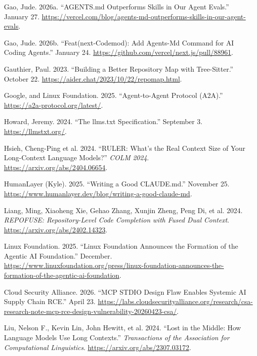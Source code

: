 \documentclass[
  11pt,
  letterpaper,
  numbers=noendperiod,
  parskip=half]{scrartcl}
\newlength{\cslhangindent}
\newenvironment{CSLReferences}[2] %
 {\begin{list}{}{%
  \setlength{\itemindent}{0pt}
  \setlength{\leftmargin}{0pt}
  \setlength{\parsep}{0pt}
  \ifodd #1
   \setlength{\leftmargin}{\cslhangindent}
   \setlength{\itemindent}{-1\cslhangindent}
  \fi
  \setlength{\itemsep}{#2\baselineskip}}}
 {\end{list}}
\begin{document}
\begin{CSLReferences}{1}{1}
Gao, Jude. 2026a. {``{AGENTS.md} Outperforms Skills in Our Agent
Evals.''} January 27.
\url{https://vercel.com/blog/agents-md-outperforms-skills-in-our-agent-evals}.

Gao, Jude. 2026b. {``Feat(next-Codemod): Add Agents-Md Command for {AI}
Coding Agents.''} January 24.
\url{https://github.com/vercel/next.js/pull/88961}.

Gauthier, Paul. 2023. {``Building a Better Repository Map with
Tree-Sitter.''} October 22.
\url{https://aider.chat/2023/10/22/repomap.html}.

Google, and Linux Foundation. 2025. {``Agent-to-Agent Protocol
({A2A}).''} \url{https://a2a-protocol.org/latest/}.

Howard, Jeremy. 2024. {``The {llms.txt} Specification.''} September 3.
\url{https://llmstxt.org/}.

{Hsieh, Cheng-Ping et al.} 2024. {``{RULER}: What's the Real Context
Size of Your Long-Context Language Models?''} \emph{COLM 2024}.
\url{https://arxiv.org/abs/2404.06654}.

HumanLayer (Kyle). 2025. {``Writing a Good {CLAUDE.md}.''} November 25.
\url{https://www.humanlayer.dev/blog/writing-a-good-claude-md}.

{Liang, Ming, Xiaoheng Xie, Gehao Zhang, Xunjin Zheng, Peng Di, et al.}
2024. \emph{{REPOFUSE}: Repository-Level Code Completion with Fused Dual
Context}. \url{https://arxiv.org/abs/2402.14323}.

Linux Foundation. 2025. {``{Linux Foundation} Announces the Formation of
the {Agentic AI Foundation}.''} December.
\url{https://www.linuxfoundation.org/press/linux-foundation-announces-the-formation-of-the-agentic-ai-foundation}.

Cloud Security Alliance. 2026. {``{MCP} {STDIO} Design Flaw Enables
Systemic {AI} Supply Chain {RCE}.''} April 23.
\url{https://labs.cloudsecurityalliance.org/research/csa-research-note-mcp-rce-design-vulnerability-20260423-csa/}.

Liu, Nelson F., Kevin Lin, John Hewitt, et al. 2024. {``Lost in the
Middle: How Language Models Use Long Contexts.''} \emph{Transactions of
the Association for Computational Linguistics}.
\url{https://arxiv.org/abs/2307.03172}.


\end{CSLReferences}
\end{document}
